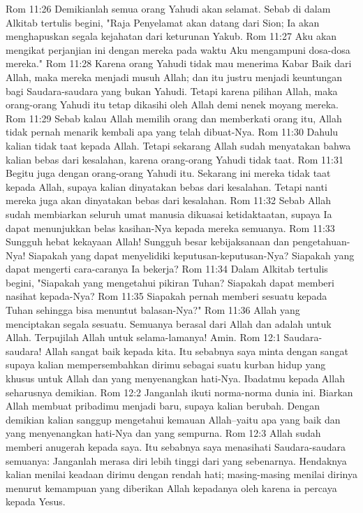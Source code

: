 Rom 11:26  Demikianlah semua orang Yahudi akan selamat. Sebab di dalam Alkitab tertulis begini, "Raja Penyelamat akan datang dari Sion; Ia akan menghapuskan segala kejahatan dari keturunan Yakub.
Rom 11:27  Aku akan mengikat perjanjian ini dengan mereka pada waktu Aku mengampuni dosa-dosa mereka."
Rom 11:28  Karena orang Yahudi tidak mau menerima Kabar Baik dari Allah, maka mereka menjadi musuh Allah; dan itu justru menjadi keuntungan bagi Saudara-saudara yang bukan Yahudi. Tetapi karena pilihan Allah, maka orang-orang Yahudi itu tetap dikasihi oleh Allah demi nenek moyang mereka.
Rom 11:29  Sebab kalau Allah memilih orang dan memberkati orang itu, Allah tidak pernah menarik kembali apa yang telah dibuat-Nya.
Rom 11:30  Dahulu kalian tidak taat kepada Allah. Tetapi sekarang Allah sudah menyatakan bahwa kalian bebas dari kesalahan, karena orang-orang Yahudi tidak taat.
Rom 11:31  Begitu juga dengan orang-orang Yahudi itu. Sekarang ini mereka tidak taat kepada Allah, supaya kalian dinyatakan bebas dari kesalahan. Tetapi nanti mereka juga akan dinyatakan bebas dari kesalahan.
Rom 11:32  Sebab Allah sudah membiarkan seluruh umat manusia dikuasai ketidaktaatan, supaya Ia dapat menunjukkan belas kasihan-Nya kepada mereka semuanya.
Rom 11:33  Sungguh hebat kekayaan Allah! Sungguh besar kebijaksanaan dan pengetahuan-Nya! Siapakah yang dapat menyelidiki keputusan-keputusan-Nya? Siapakah yang dapat mengerti cara-caranya Ia bekerja?
Rom 11:34  Dalam Alkitab tertulis begini, "Siapakah yang mengetahui pikiran Tuhan? Siapakah dapat memberi nasihat kepada-Nya?
Rom 11:35  Siapakah pernah memberi sesuatu kepada Tuhan sehingga bisa menuntut balasan-Nya?"
Rom 11:36  Allah yang menciptakan segala sesuatu. Semuanya berasal dari Allah dan adalah untuk Allah. Terpujilah Allah untuk selama-lamanya! Amin.
Rom 12:1  Saudara-saudara! Allah sangat baik kepada kita. Itu sebabnya saya minta dengan sangat supaya kalian mempersembahkan dirimu sebagai suatu kurban hidup yang khusus untuk Allah dan yang menyenangkan hati-Nya. Ibadatmu kepada Allah seharusnya demikian.
Rom 12:2  Janganlah ikuti norma-norma dunia ini. Biarkan Allah membuat pribadimu menjadi baru, supaya kalian berubah. Dengan demikian kalian sanggup mengetahui kemauan Allah--yaitu apa yang baik dan yang menyenangkan hati-Nya dan yang sempurna.
Rom 12:3  Allah sudah memberi anugerah kepada saya. Itu sebabnya saya menasihati Saudara-saudara semuanya: Janganlah merasa diri lebih tinggi dari yang sebenarnya. Hendaknya kalian menilai keadaan dirimu dengan rendah hati; masing-masing menilai dirinya menurut kemampuan yang diberikan Allah kepadanya oleh karena ia percaya kepada Yesus.

